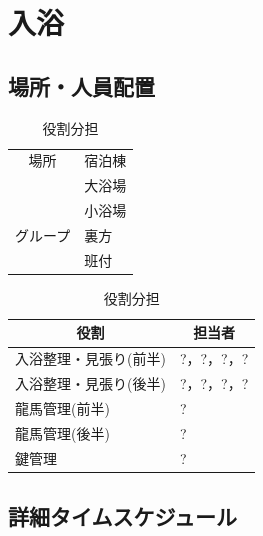 \newpage

\section{入浴}  %

\subsection{場所・人員配置}
\begin{table}[h]
  \centering
  \begin{minipage}[t]{0.48\columnwidth}
    \centering
    \caption{場所・該当グループ}
    \begin{tabular}{cl}
      \hline
      場所 & 宿泊棟 \\
      & 大浴場 \\
      & 小浴場 \\
      \hline
      グループ & 裏方 \\
      & 班付 \\
      \hline
    \end{tabular}
  \end{minipage}
  \begin{minipage}[t]{0.48\columnwidth}
    \centering
    \caption{役割分担}
    \begin{tabular}{ll}
      \hline
      \multicolumn{1}{c}{役割} & \multicolumn{1}{c}{担当者} \\
      \hline
      入浴整理・見張り(前半) & ?，?，?，? \\
      入浴整理・見張り(後半) & ?，?，?，? \\
      龍馬管理(前半) & ? \\
      龍馬管理(後半) & ? \\
      鍵管理 & ? \\
      \hline
    \end{tabular}
  \end{minipage}
\end{table}

\subsection{詳細タイムスケジュール}
\vspace{0.5em}
\fontsize{8pt}{12pt}\selectfont

